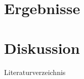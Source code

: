 \documentclass[%
    handout,
    aspectratio=1610,
    10pt,
    onlytextwidth, %
]{beamer}
\begin{document}
\section{Ergebnisse}
\section{Diskussion}

\begin{frame}{Literaturverzeichnis}
    \printbibliography
\end{frame}

\end{document}
